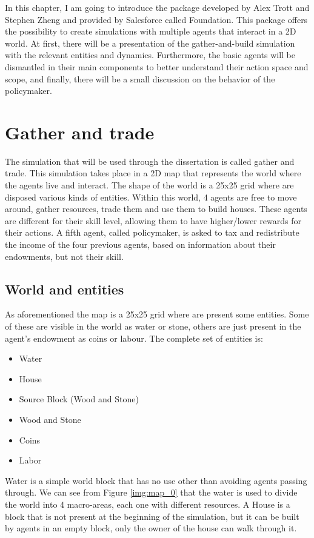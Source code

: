 In this chapter, I am going to introduce the package developed by Alex Trott and Stephen Zheng and provided by Salesforce called Foundation\cite{zheng2020ai}. This package offers the possibility to create simulations with multiple agents that interact in a 2D world. At first, there will be a presentation of the gather-and-build simulation with the relevant entities and dynamics. Furthermore, the basic agents will be dismantled in their main components to better understand their action space and scope, and finally, there will be a small discussion on the behavior of the policymaker.

\section{Gather and trade}

The simulation that will be used through the dissertation is called gather and trade. This simulation takes place in a 2D map that represents the world where the agents live and interact. The shape of the world is a 25x25 grid where are disposed various kinds of entities. Within this world, 4 agents are free to move around, gather resources, trade them and use them to build houses. These agents are different for their skill level, allowing them to have higher/lower rewards for their actions. A fifth agent, called policymaker, is asked to tax and redistribute the income of the four previous agents, based on information about their endowments, but not their skill.

\subsection{World and entities}

As aforementioned the map is a 25x25 grid where are present some entities. Some of these are visible in the world as water or stone, others are just present in the agent's endowment as coins or labour. The complete set of entities is:

\begin{itemize}
    \item Water
    \item House
    \item Source Block (Wood and Stone)
    \item Wood and Stone
    \item Coins
    \item Labor
\end{itemize}

Water is a simple world block that has no use other than avoiding agents passing through. We can see from Figure \ref{img:map_0} that the water is used to divide the world into 4 macro-areas, each one with different resources. 
A House is a block that is not present at the beginning of the simulation, but it can be built by agents in an empty block, only the owner of the house can walk through it.


